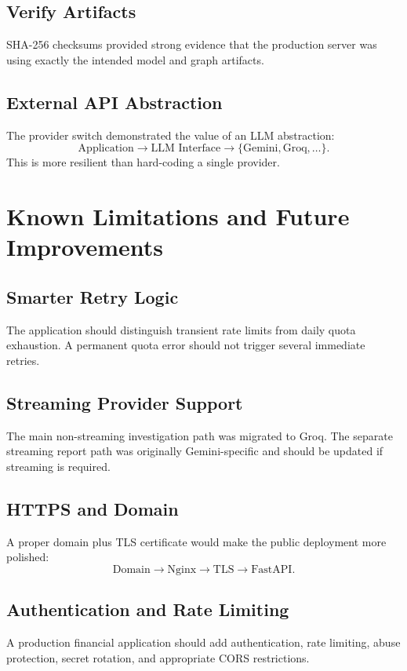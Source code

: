 \documentclass[11pt,a4paper]{article}
\begin{document}
\subsection{Verify Artifacts}
SHA-256 checksums provided strong evidence that the production server was using exactly the intended model and graph artifacts.

\subsection{External API Abstraction}
The provider switch demonstrated the value of an LLM abstraction:
\[
\text{Application}\rightarrow\text{LLM Interface}
\rightarrow\{\text{Gemini},\text{Groq},\ldots\}.
\]
This is more resilient than hard-coding a single provider.

\section{Known Limitations and Future Improvements}
\subsection{Smarter Retry Logic}
The application should distinguish transient rate limits from daily quota exhaustion. A permanent quota error should not trigger several immediate retries.

\subsection{Streaming Provider Support}
The main non-streaming investigation path was migrated to Groq. The separate streaming report path was originally Gemini-specific and should be updated if streaming is required.

\subsection{HTTPS and Domain}
A proper domain plus TLS certificate would make the public deployment more polished:
\[
\text{Domain}\rightarrow\text{Nginx}\rightarrow\text{TLS}\rightarrow\text{FastAPI}.
\]

\subsection{Authentication and Rate Limiting}
A production financial application should add authentication, rate limiting, abuse protection, secret rotation, and appropriate CORS restrictions.
\end{document}
